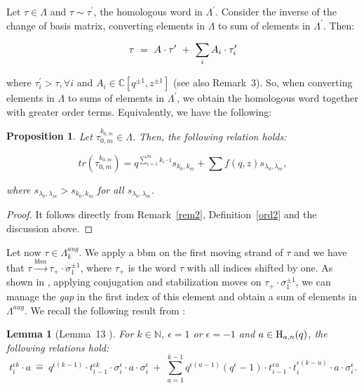 \documentclass[11pt]{amsart}
\newtheorem{lemma}{Lemma}
\newtheorem{prop}{Proposition}
\begin{document}
Let $\tau\in \Lambda$ and $\tau \sim \tau^{\prime}$, the homologous word in $\Lambda^{\prime}$. Consider the inverse of the change of basis matrix, converting elements in $\Lambda$ to sum of elements in $\Lambda^{\prime}$. Then:

\[
\tau \ = \ A\cdot \tau^{\prime} \ + \ \sum_i A_i \cdot \tau_i^{\prime}\\
\] 

\noindent where $\tau_i^{\prime}>\tau, \forall i$ and $A_i\in \mathbb{C}[q^{\pm 1}, z^{\pm 1}]$ (see also Remark~3). So, when converting elements in $\Lambda$ to sums of elements in $\Lambda^{\prime}$, we obtain the homologous word together with greater order terms. Equivalently,
we have the following:


\begin{prop}
Let $\tau_{0,m}^{k_{0,m}} \in \Lambda$. Then, the following relation holds:

$$tr(\tau_{0,m}^{k_{0,m}})=q^{\sum_{i=1}^{m}{k_i\cdot i}}s_{k_{0}, k_{m}} + \sum f(q,z) s_{\lambda_{0}, \lambda_{m}},$$

\noindent where $s_{\lambda_{0}, \lambda_{m}} > s_{k_{0}, k_{m}}$ for all $s_{\lambda_{0}, \lambda_{m}}$.
\end{prop}

\begin{proof}
It follows directly from Remark~\ref{rem2}, Definition~\ref{ord2} and the discussion above.
\end{proof}

Let now $\tau \in \Lambda_k^{aug}$. We apply a bbm on the first moving strand of $\tau$ and we have that $\tau \overset{bbm}{\longrightarrow} \tau_+\cdot \sigma_1^{\pm 1}$, where $\tau_+$ is the word $\tau$ with all indices shifted by one. As shown in \cite{DL2}, applying conjugation and stabilization moves on $\tau_+\cdot \sigma_1^{\pm 1}$, we can manage the {\it gap} in the first index of this element and obtain a sum of elements in $\Lambda^{aug}$. We recall the following result from \cite{DL2}:


\begin{lemma}[Lemma~13 \cite{DL2}]\label{oldlem}
For $k\in \mathbb{N}$, $\epsilon =1$ or $\epsilon =-1$ and $a\in {\rm H}_{a, n}(q)$, the following relations hold:
\[
t_i^{\epsilon k}\cdot a\ \widehat{=}\ q^{\epsilon (k-1)}\cdot t_{i-1}^{\epsilon k}\cdot \sigma_i^{\epsilon}\cdot a\cdot \sigma_i^{\epsilon} \ +\ \underset{u=1}{\overset{k-1}{\sum}} q^{\epsilon (u-1)} (q^{\epsilon}-1)\cdot t_{i-1}^{\epsilon u}\cdot t_i^{\epsilon (k-u)}\cdot a\cdot \sigma_i^{\epsilon}.
\]
\end{lemma}
\end{document}
